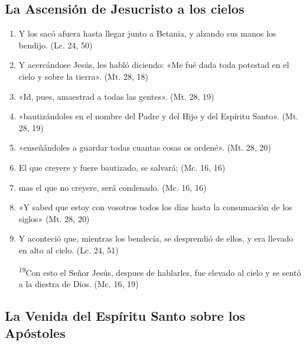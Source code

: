 \documentclass[a4paper,11pt]{article}
\begin{document}
    \subsection*{\hfil La Ascensión de Jesucristo a los cielos \hfil}
        
      \begin{enumerate} 
        \item Y los sacó afuera hasta llegar junto a Betania, y alzando sus manos los bendijo. (Lc. 24, 50)

        \item Y acercándose Jesús, les habló diciendo: «Me fué dada toda potestad en el cielo y sobre la tierra». (Mt. 28, 18)

        \item «Id, pues, amaestrad a todas las gentes». (Mt. 28, 19)

        \item «bautizándoles en el nombre del Padre y del Hijo y del Espíritu Santo». (Mt. 28, 19)

        \item «enseñándoles a guardar todas cuantas cosas os ordené». (Mt. 28, 20)

        \item El que creyere y fuere bautizado, se salvará; (Mc. 16, 16)

        \item mas el que no creyere, será condenado. (Mc. 16, 16)

        \item «Y sabed que estoy con vosotros todos los días hasta la consumación de los siglos» (Mt. 28, 20)

        \item Y aconteció que, mientras los bendecía, se desprendió de ellos, y era llevado en alto al cielo. (Lc. 24, 51)

        \textsuperscript{19}Con esto el Señor Jesús, despues de hablarles, fue elevado al cielo y se sentó a la diestra de Dios. (Mc. 16, 19)

      \end{enumerate}

    \subsection*{\hfil La Venida del Espíritu Santo sobre los Apóstoles \hfil}
\end{document}
